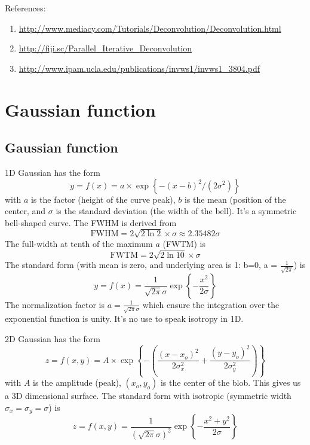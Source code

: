 References:
\begin{enumerate}
  \item \url{http://www.mediacy.com/Tutorials/Deconvolution/Deconvolution.html}
  \item \url{http://fiji.sc/Parallel_Iterative_Deconvolution}
  \item \url{http://www.ipam.ucla.edu/publications/invws1/invws1_3804.pdf}
\end{enumerate}

\section{Gaussian function}

\subsection{Gaussian function}

1D Gaussian has the form
\begin{equation}
y = f(x) = a \times \exp \left\{ - (x-b)^2/(2\sigma^2) \right\}
\end{equation}
with $a$ is the factor (height of the curve peak), $b$	 is the mean (position
of the center, and $\sigma$ is the standard deviation (the width of the bell).
It's a symmetric bell-shaped curve. The FWHM is derived from
\begin{equation}
\text{FWHM} = 2\sqrt{2\ln2}\times \sigma \approx 2.35482 \sigma
\end{equation}
The full-width at tenth of the maximum $a$ (FWTM) is 
\begin{equation}
\text{FWTM} = 2\sqrt{2\ln10}\times \sigma
\end{equation}
The standard form (with mean is zero, and underlying area is 1: b=0, a =
$\frac{1}{\sqrt{2\pi}}$) is
\begin{equation}
y = f(x) = \frac{1}{\sqrt{2\pi}\sigma} \exp\left\{ -\frac{x^2}{2\sigma} \right\}
\end{equation}
The normalization factor is $a=\frac{1}{\sqrt{2\pi}\sigma}$ which ensure the
integration over the exponential function is unity. It's no use to speak
isotropy in 1D. 

2D Gaussian has the form
\begin{equation}
z = f(x,y) = A\times \exp \left\{ -\left( \frac{(x-x_o)^2}{2\sigma_x^2} +
\frac{(y-y_o)^2}{2\sigma_y^2} \right) \right\}
\end{equation}
with $A$ is the amplitude (peak), $(x_o,y_o)$ is the center of the blob. This
gives us a 3D dimensional surface. The standard form with isotropic (symmetric
width $\sigma_x=\sigma_y=\sigma$) is
\begin{equation}
z = f(x,y) = \frac{1}{(\sqrt{2\pi}\sigma)^2} \exp\left\{
-\frac{x^2+y^2}{2\sigma} \right\}
\end{equation}


